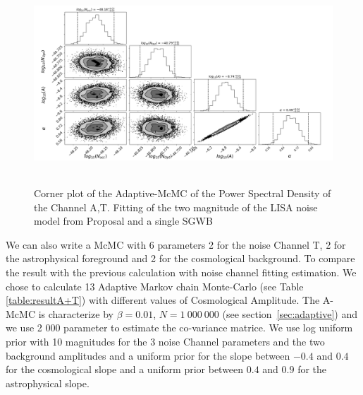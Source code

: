 \documentclass[a4paper,12pt]{article}
\begin{document}
\begin{figure}[H]
    \centering
    \includegraphics[height= 7.5cm]{covarince/Corner.png}
    \caption{Corner plot of the Adaptive-McMC of the Power Spectral Density of the Channel A,T. Fitting of the two magnitude of the LISA noise model from Proposal \cite{LSR} and a single SGWB}
    \label{fig_corncovmcmc}
\end{figure}

We can also write a McMC with 6 parameters 2 for the noise Channel T, 2 for the astrophysical foreground and 2 for the cosmological background. To compare the result with the previous calculation with noise channel fitting estimation. We chose to calculate 13 Adaptive Markov chain Monte-Carlo (see Table \ref{table:resultA+T}) with different values of Cosmological Amplitude.  The A-McMC is characterize by $\beta = 0.01$, $N = 1 \ 000 \ 000$ (see section~\ref{sec:adaptive}) and we use 2 000 parameter to estimate the co-variance matrice. We use log uniform prior with 10 magnitudes for the 3 noise Channel parameters and the two background amplitudes and a uniform prior for the slope between $-0.4$ and $0.4$ for the cosmological slope and a uniform prior between $0.4$ and $0.9$ for the astrophysical slope. 
\end{document}
